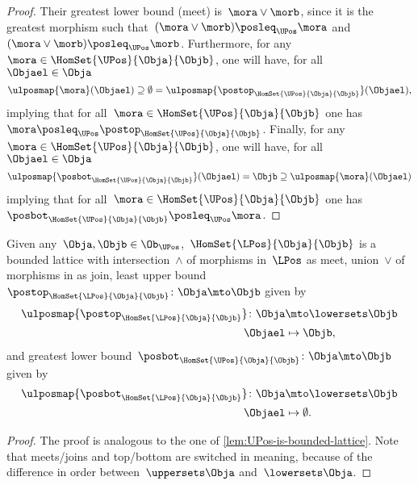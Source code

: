 \begin{proof}
    Their greatest lower bound (meet) is~$\mora \vee \morb$, since it is the greatest morphism such that~$(\mora \vee \morb)\posleq_\UPos \mora $ and~$(\mora \vee \morb)\posleq_\UPos \morb$.
    Furthermore, for any~$\mora \in \HomSet{\UPos}{\Obja}{\Objb}$, one will have, for all~$\Objael \in \Obja$
    \begin{equation*}
        \ulposmap{\mora}(\Objael) \supseteq \emptyset=\ulposmap{\postop_{\HomSet{\UPos}{\Obja}{\Objb}}}(\Objael),
    \end{equation*}
    implying that for all~$\mora \in \HomSet{\UPos}{\Obja}{\Objb}$ one has~$\mora \posleq_\UPos \postop_{\HomSet{\UPos}{\Obja}{\Objb}}$.
    Finally, for any~$\mora \in \HomSet{\UPos}{\Obja}{\Objb}$, one will have, for all~$\Objael \in \Obja$
    \begin{equation*}
        \ulposmap{\posbot_{\HomSet{\UPos}{\Obja}{\Objb}}}(\Objael)=\Objb \supseteq \ulposmap{\mora}(\Objael)
    \end{equation*}
    implying that for all~$\mora \in \HomSet{\UPos}{\Obja}{\Objb}$ one has~$\posbot_{\HomSet{\UPos}{\Obja}{\Objb}}\posleq_\UPos \mora$.
\end{proof}

\begin{lemma}
    \label{lem:LPos-is-bounded-lattice}
    Given any~$\Obja,\Objb\in \Ob_\UPos$,~$\HomSet{\LPos}{\Obja}{\Objb}$ is a bounded lattice with intersection~$\wedge$ of morphisms in~$\LPos$ as meet, union~$\vee$ of morphisms in \LPos as join, least upper bound~$\postop_{\HomSet{\LPos}{\Obja}{\Objb}}\colon \Obja \mto \Objb$ given by
    \begin{equation*}
        \begin{aligned}
            \ulposmap{\postop_{\HomSet{\LPos}{\Obja}{\Objb}}}\colon \Obja &\mto \lowersets \Objb\\
            \Objael &\mapsto \Objb,
        \end{aligned}
    \end{equation*}
    and greatest lower bound~$\posbot_{\HomSet{\UPos}{\Obja}{\Objb}}\colon \Obja \mto \Objb$ given by
    \begin{equation*}
        \begin{aligned}
            \ulposmap{\posbot_{\HomSet{\LPos}{\Obja}{\Objb}}}\colon \Obja &\mto \lowersets \Objb\\
            \Objael &\mapsto \emptyset.
        \end{aligned}
    \end{equation*}
\end{lemma}
\begin{proof}
    The proof is analogous to the one of \cref{lem:UPos-is-bounded-lattice}.
    Note that meets/joins and top/bottom are switched in meaning, because of the difference in order between~$\uppersets \Obja$ and~$\lowersets \Obja$.
\end{proof}


